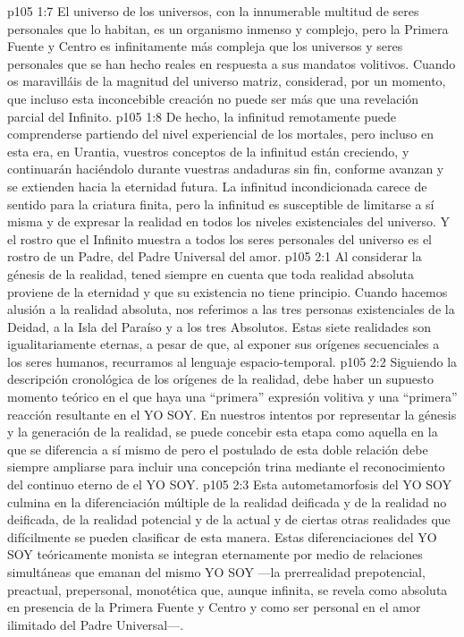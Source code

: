 \vs p105 1:7 El universo de los universos, con la innumerable multitud de seres personales que lo habitan, es un organismo inmenso y complejo, pero la Primera Fuente y Centro es infinitamente más compleja que los universos y seres personales que se han hecho reales en respuesta a sus mandatos volitivos. Cuando os maravilláis de la magnitud del universo matriz, considerad, por un momento, que incluso esta inconcebible creación no puede ser más que una revelación parcial del Infinito.
\vs p105 1:8 De hecho, la infinitud remotamente puede comprenderse partiendo del nivel experiencial de los mortales, pero incluso en esta era, en Urantia, vuestros conceptos de la infinitud están creciendo, y continuarán haciéndolo durante vuestras andaduras sin fin, conforme avanzan y se extienden hacia la eternidad futura. La infinitud incondicionada carece de sentido para la criatura finita, pero la infinitud es susceptible de limitarse a sí misma y de expresar la realidad en todos los niveles existenciales del universo. Y el rostro que el Infinito muestra a todos los seres personales del universo es el rostro de un Padre, del Padre Universal del amor.
\vs p105 2:1 Al considerar la génesis de la realidad, tened siempre en cuenta que toda realidad absoluta proviene de la eternidad y que su existencia no tiene principio. Cuando hacemos alusión a la realidad absoluta, nos referimos a las tres personas existenciales de la Deidad, a la Isla del Paraíso y a los tres Absolutos. Estas siete realidades son igualitariamente eternas, a pesar de que, al exponer sus orígenes secuenciales a los seres humanos, recurramos al lenguaje espacio\hyp{}temporal.
\vs p105 2:2 \pc Siguiendo la descripción cronológica de los orígenes de la realidad, debe haber un supuesto momento teórico en el que haya una “primera” expresión volitiva y una “primera” reacción resultante en el YO SOY. En nuestros intentos por representar la génesis y la generación de la realidad, se puede concebir esta etapa como aquella en la que  se diferencia a sí mismo de  pero el postulado de esta doble relación debe siempre ampliarse para incluir una concepción trina mediante el reconocimiento del continuo eterno de  el YO SOY.
\vs p105 2:3 Esta autometamorfosis del YO SOY culmina en la diferenciación múltiple de la realidad deificada y de la realidad no deificada, de la realidad potencial y de la actual y de ciertas otras realidades que difícilmente se pueden clasificar de esta manera. Estas diferenciaciones del YO SOY teóricamente monista se integran eternamente por medio de relaciones simultáneas que emanan del mismo YO SOY ---la prerrealidad prepotencial, preactual, prepersonal, monotética que, aunque infinita, se revela como absoluta en presencia de la Primera Fuente y Centro y como ser personal en el amor ilimitado del Padre Universal---.
